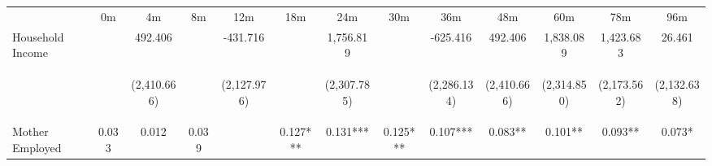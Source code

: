 \begin{tabular}{lcccccccccccc}
\hline \noalign{\smallskip} & 0m & 4m & 8m & 12m & 18m & 24m & 30m & 36m & 48m & 60m & 78m & 96m\\
\noalign{\smallskip}\hline \noalign{\smallskip}Household Income &  & 492.406 &  & -431.716 &  & 1,756.819 &  & -625.416 & 492.406 & 1,838.089 & 1,423.683 & 26.461\\
 & \begin{footnotesize}\end{footnotesize} & \begin{footnotesize}(2,410.666)\end{footnotesize} & \begin{footnotesize}\end{footnotesize} & \begin{footnotesize}(2,127.976)\end{footnotesize} & \begin{footnotesize}\end{footnotesize} & \begin{footnotesize}(2,307.785)\end{footnotesize} & \begin{footnotesize}\end{footnotesize} & \begin{footnotesize}(2,286.134)\end{footnotesize} & \begin{footnotesize}(2,410.666)\end{footnotesize} & \begin{footnotesize}(2,314.850)\end{footnotesize} & \begin{footnotesize}(2,173.562)\end{footnotesize} & \begin{footnotesize}(2,132.638)\end{footnotesize}\\
\noalign{\smallskip}Mother Employed & 0.033 & 0.012 & 0.039 &  & 0.127*** & 0.131*** & 0.125*** & 0.107*** & 0.083** & 0.101** & 0.093** & 0.073*\\

\end{tabular}
